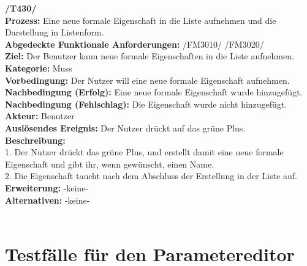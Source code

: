 \documentclass[a4paper]{scrreprt}
\begin{document}
\textbf{/T430/}\\
\textbf{Prozess: }Eine neue formale Eigenschaft in die Liste aufnehmen
und die Darstellung in Listenform. \\
\textbf{Abgedeckte Funktionale Anforderungen:} /FM3010/ /FM3020/ \\
\textbf{Ziel:} Der Benutzer kann neue formale Eigenschaften in die Liste
aufnehmen. \\
\textbf{Kategorie:} Muss\\
\textbf{Vorbedingung:} Der Nutzer will eine neue formale Eigenschaft
aufnehmen.\\
\textbf{Nachbedingung (Erfolg):} Eine neue formale Eigenschaft wurde
hinzugefügt.\\
\textbf{Nachbedingung (Fehlschlag):} Die Eigenschaft wurde nicht hinzugefügt.\\
\textbf{Akteur:} Benutzer\\
\textbf{Auslösendes Ereignis:} Der Nutzer drückt auf das grüne Plus.\\
\textbf{Beschreibung:} \\
1. Der Nutzer drückt das grüne Plus, und erstellt damit eine neue formale
Eigenschaft und gibt ihr, wenn gewünscht, einen Name.\\
2. Die Eigenschaft taucht nach dem Abschluss der Erstellung in der Liste auf.\\
\textbf {Erweiterung:}  -keine- \\
\textbf {Alternativen:} -keine- \\ \\


\section{Testfälle für den Parametereditor}
\end{document}
